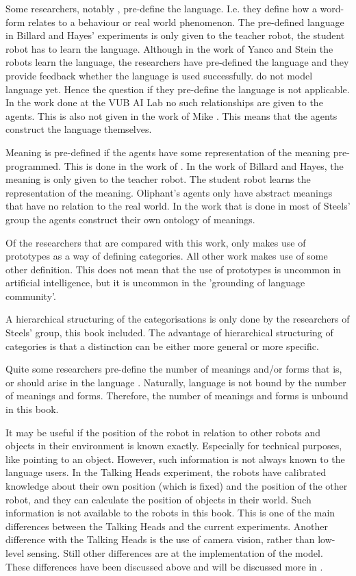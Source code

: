 Some researchers, notably \citep{billard:1997a,cangelosiparisi:1998,yancostein}, pre-define the language. I.e. they define how a word-form relates to a behaviour or real world phenomenon. The pre-defined language in Billard and Hayes' experiments is only given to the teacher robot, the student robot has to learn the language. Although in the work of Yanco and Stein the robots learn the language, the researchers have pre-defined the language and they provide feedback whether the language is used successfully. \citet{rosenstein:1998a} do not model language yet. Hence the question if they pre-define the language is not applicable. In the work done at the VUB AI Lab no such relationships are given to the agents. This is also not given in the work of Mike \citet{oliphant:1997}. This means that the agents construct the language themselves. 

Meaning is pre-defined if the agents have some representation of the meaning pre-programmed. This is done in the work of \citep{billard:1997a,oliphant:1997,yancostein}. In the work of Billard and Hayes, the meaning is only given to the teacher robot. The student robot learns the representation of the meaning. Oliphant's agents only have abstract meanings that have no relation to the real world. In the work that is done in most of Steels' group the agents construct their own ontology of meanings.

Of the researchers that are compared with this work, only \citet{rosenstein:1998a} makes use of prototypes as a way of defining categories. All other work makes use of some other definition. This does not mean that the use of prototypes is uncommon in artificial intelligence, but it is uncommon in the 'grounding of language community'.

A hierarchical structuring of the categorisations is only done by the researchers of Steels' group, this book included. The advantage of hierarchical structuring of categories is that a distinction can be either more general or more specific.

Quite some researchers pre-define the number of meanings and/or forms that is, or should arise in the language \citep{billard:1997a,cangelosiparisi:1998,oliphant:1997,yancostein}. Naturally, language is not bound by the number of meanings and forms. Therefore, the number of meanings and forms is unbound in this book.

It may be useful if the position of the robot in relation to other robots and objects in their environment is known exactly. Especially for technical purposes, like pointing to an object. However, such information is not always known to the language users. In the Talking Heads experiment, the robots have calibrated knowledge about their own position (which is fixed) and the position of the other robot, and they can calculate the position of objects in their world. Such information is not available to the robots in this book. This is one of the main differences between the Talking Heads and the current experiments. Another difference with the Talking Heads is the use of camera vision, rather than low-level sensing. Still other differences are at the implementation of the model. These differences have been discussed above and will be discussed more in .

